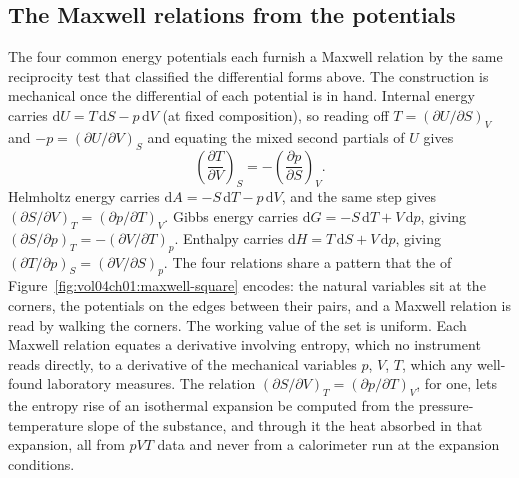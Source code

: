 \subsection{The Maxwell relations from the potentials}

The four common energy potentials each furnish a Maxwell relation by the
same reciprocity test that classified the differential forms above. The
construction is mechanical once the differential of each potential is in
hand. Internal energy carries $\mathrm{d}U = T\,\mathrm{d}S - p\,\mathrm{d}V$
(at fixed composition), so reading off $T = (\partial U/\partial S)_V$ and
$-p = (\partial U/\partial V)_S$ and equating the mixed second partials of
$U$ gives
\[
\left(\frac{\partial T}{\partial V}\right)_S =
-\left(\frac{\partial p}{\partial S}\right)_V.
\]
Helmholtz energy carries $\mathrm{d}A = -S\,\mathrm{d}T - p\,\mathrm{d}V$,
and the same step gives
$(\partial S/\partial V)_T = (\partial p/\partial T)_V$. Gibbs energy carries
$\mathrm{d}G = -S\,\mathrm{d}T + V\,\mathrm{d}p$, giving
$(\partial S/\partial p)_T = -(\partial V/\partial T)_p$. Enthalpy carries
$\mathrm{d}H = T\,\mathrm{d}S + V\,\mathrm{d}p$, giving $(\partial T/\partial
p)_S = (\partial V/\partial S)_p$. The four relations share a pattern that
the  of
Figure~\ref{fig:vol04ch01:maxwell-square} encodes: the natural variables sit
at the corners, the potentials on the edges between their pairs, and a
Maxwell relation is read by walking the corners. The working value of the
set is uniform. Each Maxwell relation equates a derivative involving entropy,
which no instrument reads directly, to a derivative of the mechanical
variables $p$, $V$, $T$, which any well-found laboratory measures. The
relation $(\partial S/\partial V)_T = (\partial p/\partial T)_V$, for one,
lets the entropy rise of an isothermal expansion be computed from the
pressure-temperature slope of the substance, and through it the heat absorbed
in that expansion, all from $pVT$ data and never from a calorimeter run at
the expansion conditions.



